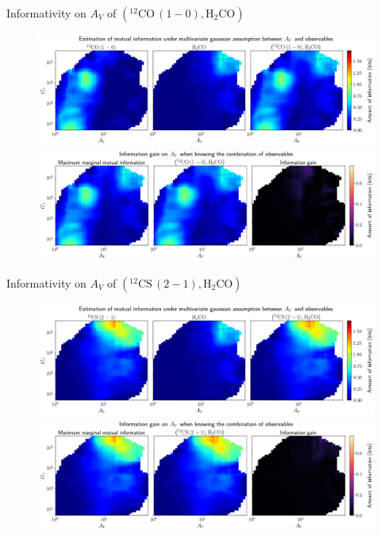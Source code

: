 \documentclass{beamer}
\begin{document}
\begin{frame}{Informativity on $A_V$ of $\left(\mathrm{^{12}CO\,(1-0)},\mathrm{H_2CO}\right)$}
    \begin{figure}
        \centering
        \includegraphics[width=0.95\linewidth]{../linearinfo/av__12co10_h2co_linearinfo.png}
        \vfill
        \includegraphics[width=0.95\linewidth]{../linearinfo/av__12co10_h2co_linearinfo_gain.png}
    \end{figure}
\end{frame}

\begin{frame}{Informativity on $A_V$ of $\left(\mathrm{^{12}CS\,(2-1)},\mathrm{H_2CO}\right)$}
    \begin{figure}
        \centering
        \includegraphics[width=0.95\linewidth]{../linearinfo/av__12cs21_h2co_linearinfo.png}
        \vfill
        \includegraphics[width=0.95\linewidth]{../linearinfo/av__12cs21_h2co_linearinfo_gain.png}
    \end{figure}
\end{frame}
\end{document}
